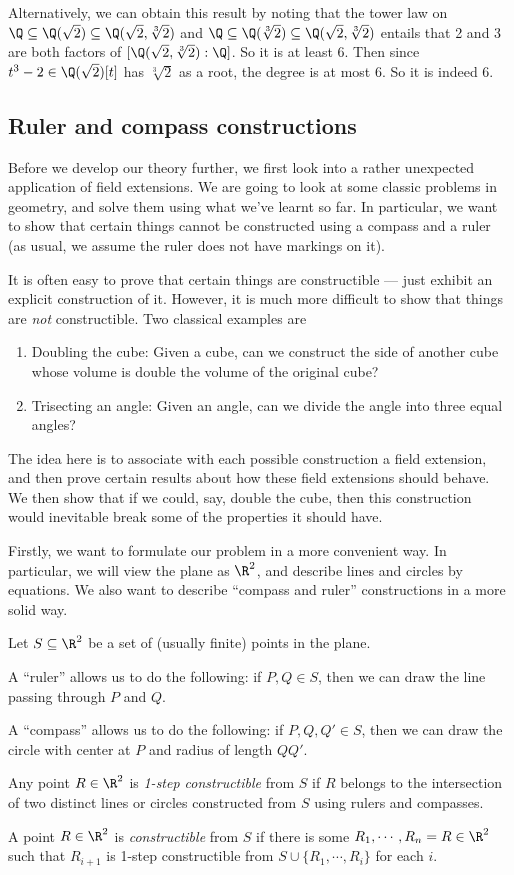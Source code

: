 \documentclass[a4paper]{article}
\begin{document}
\begin{eg}
  Alternatively, we can obtain this result by noting that the tower law on $\Q \subseteq \Q(\sqrt{2})\subseteq \Q(\sqrt{2}, \sqrt[3]{2})$ and $\Q\subseteq \Q(\sqrt[3]{2}) \subseteq \Q(\sqrt{2}, \sqrt[3]{2})$ entails that 2 and 3 are both factors of $[\Q(\sqrt{2}, \sqrt[3]{2}):\Q]$. So it is at least $6$. Then since $t^3 - 2\in \Q(\sqrt{2})[t]$ has $\sqrt[3]{2}$ as a root, the degree is at most 6. So it is indeed 6.
\end{eg}
\subsection{Ruler and compass constructions}
Before we develop our theory further, we first look into a rather unexpected application of field extensions. We are going to look at some classic problems in geometry, and solve them using what we've learnt so far. In particular, we want to show that certain things cannot be constructed using a compass and a ruler (as usual, we assume the ruler does not have markings on it).

It is often easy to prove that certain things are constructible --- just exhibit an explicit construction of it. However, it is much more difficult to show that things are \emph{not} constructible. Two classical examples are
\begin{enumerate}
  \item Doubling the cube: Given a cube, can we construct the side of another cube whose volume is double the volume of the original cube?
  \item Trisecting an angle: Given an angle, can we divide the angle into three equal angles?
\end{enumerate}
The idea here is to associate with each possible construction a field extension, and then prove certain results about how these field extensions should behave. We then show that if we could, say, double the cube, then this construction would inevitable break some of the properties it should have.

Firstly, we want to formulate our problem in a more convenient way. In particular, we will view the plane as $\R^2$, and describe lines and circles by equations. We also want to describe ``compass and ruler'' constructions in a more solid way.
\begin{defi}
  Let $S\subseteq \R^2$ be a set of (usually finite) points in the plane.

  A ``ruler'' allows us to do the following: if $P, Q\in S$, then we can draw the line passing through $P$ and $Q$.

  A ``compass'' allows us to do the following: if $P, Q, Q'\in S$, then we can draw the circle with center at $P$ and radius of length $QQ'$.

  Any point $R\in \R^2$ is \emph{1-step constructible} from $S$ if $R$ belongs to the intersection of two distinct lines or circles constructed from $S$ using rulers and compasses.

  A point $R\in \R^2$ is \emph{constructible} from $S$ if there is some $R_1, \cdots, R_n = R \in \R^2$ such that $R_{i + 1}$ is 1-step constructible from $S\cup \{R_1, \cdots, R_i\}$ for each $i$.
\end{defi}
\end{document}
